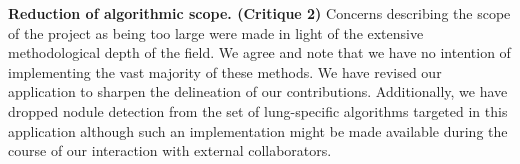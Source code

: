 \documentclass[11pt,]{article}
\begin{document}
\textbf{Reduction of algorithmic scope. (Critique 2)} Concerns
describing the scope of the project as being too large were made in
light of the extensive methodological depth of the field. We agree and
note that we have no intention of implementing the vast majority of
these methods. We have revised our application to sharpen the
delineation of our contributions. Additionally, we have dropped nodule
detection from the set of lung-specific algorithms targeted in this
application although such an implementation might be made available
during the course of our interaction with external collaborators.

\hypertarget{refs}{}
\end{document}
